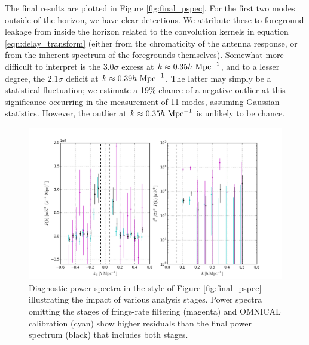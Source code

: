 \documentclass[twocolumn,numberedappendix]{emulateapj} \shorttitle{PSA64}
\newcommand{\hMpci}{h\ {\rm Mpc}^{-1}}
\begin{document}
The final results are plotted in Figure \ref{fig:final_pspec}.
For the first two modes outside of the horizon, we have
clear detections. We attribute these to foreground leakage from
inside the horizon related to the convolution kernels in equation \ref{eqn:delay_transform} (either
from the chromaticity of the antenna response, or from the inherent spectrum of the
foregrounds themselves).  Somewhat more difficult to interpret is the 
$3.0\sigma$ excess at $k\approx0.35\hMpci$, and to a lesser
degree, the $2.1\sigma$ deficit at $k\approx0.39\hMpci$.  The
latter may simply be a statistical fluctuation; we estimate a 19\% chance of 
a negative outlier at this significance occurring in the measurement of 11 modes, assuming
Gaussian statistics.  However, the outlier at $k\approx0.35\hMpci$ is
unlikely to be chance.

\begin{figure}\centering
\includegraphics[width=2\columnwidth]{plots/pspec_comparison.png}
\caption{Diagnostic power spectra in the style of Figure \ref{fig:final_pspec}
illustrating the impact of various analysis stages.
Power spectra omitting the stages of fringe-rate filtering (magenta) and 
OMNICAL calibration (cyan) show higher residuals than the final power spectrum
(black) that includes both stages.
}\label{fig:pspec_comp}
\end{figure}
\end{document}
